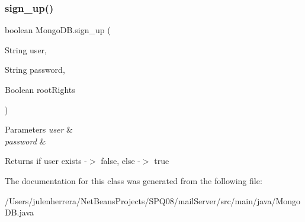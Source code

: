 \subsubsection{\texorpdfstring{sign\+\_\+up()}{sign\_up()}}
{\footnotesize\ttfamily boolean Mongo\+D\+B.\+sign\+\_\+up (\begin{DoxyParamCaption}\item[{String}]{user,  }\item[{String}]{password,  }\item[{Boolean}]{root\+Rights }\end{DoxyParamCaption})}


\begin{DoxyParams}{Parameters}
{\em user} & \\
\hline
{\em password} & \\
\hline
\end{DoxyParams}
\begin{DoxyReturn}{Returns}
if user exists -\/$>$ false, else -\/$>$ true 
\end{DoxyReturn}


The documentation for this class was generated from the following file\+:\begin{DoxyCompactItemize}
\item 
/\+Users/julenherrera/\+Net\+Beans\+Projects/\+S\+P\+Q08/mail\+Server/src/main/java/Mongo\+D\+B.\+java\end{DoxyCompactItemize}
